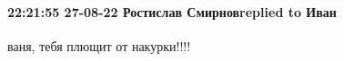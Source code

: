  
 
 
 
 

\paragraph{22:21:55 27-08-22 Ростислав Смирновreplied to Иван}
ваня, тебя плющит от накурки!!!!
